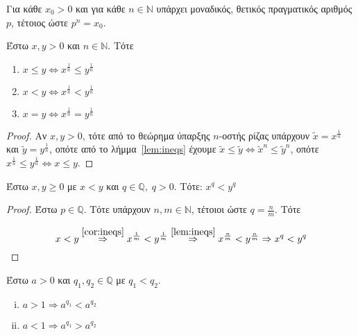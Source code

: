 \begin{mybox2}
\begin{thm}
  Για κάθε $ x_{0} >0 $ και για κάθε $ n \in \mathbb{N} $ υπάρχει μοναδικός, θετικός 
  πραγματικός αριθμός $ p $, τέτοιος ώστε $ p^{n}= x_{0} $.
\end{thm}
\end{mybox2}

\begin{cor}\label{cor:ineqs}
  Έστω $ x,y >0 $ και $ n \in \mathbb{N} $. Τότε
  \begin{enumerate}[label=(\roman*),itemjoin=\hspace{1cm}]
    \item $ x \leq y \Leftrightarrow x^{\frac{1}{n}} \leq y^{\frac{1}{n}} $
    \item $ x <y \Leftrightarrow x^{\frac{1}{n}} < y^{\frac{1}{n}} $
    \item $ x =y \Leftrightarrow x^{\frac{1}{n}} = y^{\frac{1}{n}} $
  \end{enumerate}
\end{cor}

\begin{proof}
\item {}
  Αν $ x,y>0 $, τότε από το θεώρημα ύπαρξης $n$-οστής ρίζας υπάρχουν $ \tilde{x}  
  = x^{\frac{1}{n}} $ και $ \tilde{y} =y^{\frac{1}{n}} $, οπότε από το 
  λήμμα~\ref{lem:ineqs} έχουμε $ \tilde{x} \leq \tilde{y}  \Leftrightarrow 
  \tilde{x} ^{n} \leq \tilde{y} ^{n} $,
  οπότε $ x^{\frac{1}{n}} \leq y^{\frac{1}{n}} \Leftrightarrow x \leq y $.
\end{proof}

\begin{lem}\label{lem:ineqq}
  Έστω $ x,y \geq 0 $ με $ x<y $ και $ q \in \mathbb{Q}, \; q >0 $. 
  Τότε: $ x^{q} <y^{q} $
\end{lem}

\begin{proof}
\item {}
  Έστω $ p \in \mathbb{Q} $. Τότε υπάρχουν $ n,m \in \mathbb{N} $, τέτοιοι ώστε 
  $ q = \frac{n}{m} $. Τότε 

  \[ x<y \overset{\ref{cor:ineqs}}{\Rightarrow} x^{\frac{1}{m}} 
    < y^{\frac{1}{m}} \overset{\ref{lem:ineqs}}{\Rightarrow} 
  x^{\frac{n}{m}} < y^{\frac{n}{m}} \Rightarrow x^{q} < y^{q}  \] 
\end{proof}

\begin{lem}
  Έστω $ a > 0 $ και $ q_{1}, q_{2} \in \mathbb{Q} $ με $ q_{1} < q_{2} $. 
  \begin{enumerate}[(i)]
    \item $ a>1 \Rightarrow a^{q_{1}} < a^{q_{2}} $
    \item $ a<1 \Rightarrow a^{q_{1}} > a^{q_{2}} $
  \end{enumerate}
\end{lem}

